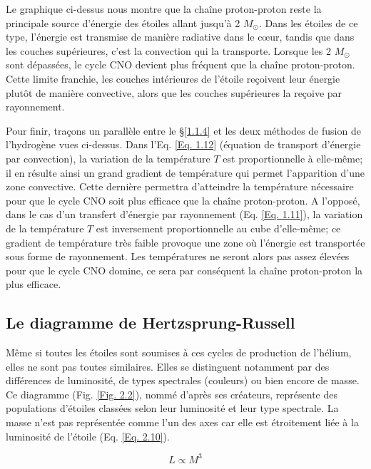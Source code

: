 Le graphique ci-dessus nous montre que la chaîne proton-proton reste la principale source d’énergie des étoiles allant jusqu’à 2 $M_\odot$. Dans les étoiles de ce type, l’énergie est transmise de manière radiative dans le cœur, tandis que dans les couches supérieures, c’est la convection qui la transporte. Lorsque les 2 $M_\odot$ sont dépassées, le cycle CNO devient plus fréquent que la chaîne proton-proton. Cette limite franchie, les couches intérieures de l’étoile reçoivent leur énergie plutôt de manière convective, alors que les couches supérieures la reçoive par rayonnement.\smallskip

Pour finir, traçons un parallèle entre le §\ref{1.1.4} et les deux méthodes de fusion de l'hydrogène vues ci-dessus. Dans l'Eq. \ref{Eq. 1.12} (équation de transport d'énergie par convection), la variation de la température $T$ est proportionnelle à elle-même; il en résulte ainsi un grand gradient de température qui permet l'apparition d'une zone convective. Cette dernière permettra d'atteindre la température nécessaire pour que le cycle CNO soit plus efficace que la chaîne proton-proton. A l'opposé, dans le cas d'un transfert d'énergie par rayonnement (Eq. \ref{Eq. 1.11}), la variation de la température $T$ est inversement proportionnelle au cube d'elle-même; ce gradient de température très faible provoque une zone où l'énergie est transportée sous forme de rayonnement. Les températures ne seront alors pas assez élevées pour que le cycle CNO domine, ce sera par conséquent la chaîne proton-proton la plus efficace. 

\subsection{Le diagramme de Hertzsprung-Russell}\label{2.1.3}

Même si toutes les étoiles sont soumises à ces cycles de production de l’hélium, elles ne sont pas toutes similaires. Elles se distinguent notamment par des différences de luminosité, de types spectrales (couleurs) ou bien encore de masse. Ce diagramme (Fig. \ref{Fig. 2.2}), nommé d’après ses créateurs, représente des populations d’étoiles classées selon leur luminosité et leur type spectrale. La masse n’est pas représentée comme l’un des axes car elle est étroitement liée à la luminosité de l’étoile (Eq. \ref{Eq. 2.10}).

\begin{equation}L \propto M^{3}\label{Eq. 2.10}\end{equation}\newpage

